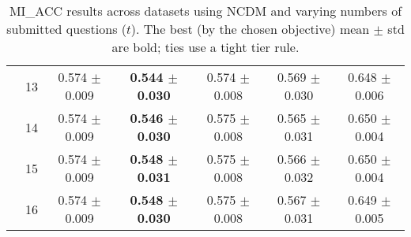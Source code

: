 \begin{table*}[t]
{\begin{tabular}{ll c c c c c}
        & 13 & 0.574 $\pm$ 0.009 & \textbf{0.544 $\pm$ 0.030} & 0.574 $\pm$ 0.008 & 0.569 $\pm$ 0.030 & 0.648 $\pm$ 0.006 \\
        & 14 & 0.574 $\pm$ 0.009 & \textbf{0.546 $\pm$ 0.030} & 0.575 $\pm$ 0.008 & 0.565 $\pm$ 0.031 & 0.650 $\pm$ 0.004 \\
        & 15 & 0.574 $\pm$ 0.009 & \textbf{0.548 $\pm$ 0.031} & 0.575 $\pm$ 0.008 & 0.566 $\pm$ 0.032 & 0.650 $\pm$ 0.004 \\
        & 16 & 0.574 $\pm$ 0.009 & \textbf{0.548 $\pm$ 0.030} & 0.575 $\pm$ 0.008 & 0.567 $\pm$ 0.031 & 0.649 $\pm$ 0.005 \\
\bottomrule
\end{tabular}
}
\caption{MI_ACC results across datasets using NCDM and varying numbers of submitted questions ($t$). The best (by the chosen objective) mean $\pm$ std are bold; ties use a tight tier rule.}
\label{tab:results-mi_acc-ncdm}
\end{table*}
